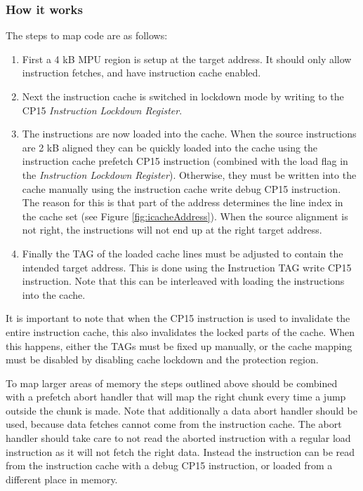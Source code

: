 \documentclass[a4paper,10pt]{report}
\begin{document}
	\subsubsection{How it works}
	The steps to map code are as follows:
	\begin{enumerate}
		\item First a 4 kB MPU region is setup at the target address. It should only allow instruction fetches, and have instruction cache enabled.
		
		\item Next the instruction cache is switched in lockdown mode by writing to the CP15 \textit{Instruction Lockdown Register}.
		
		\item The instructions are now loaded into the cache. When the source instructions are 2 kB aligned they can be quickly loaded into the cache using the instruction cache prefetch CP15 instruction (combined with the load flag in the \textit{Instruction Lockdown Register}). Otherwise, they must be written into the cache manually using the instruction cache write debug CP15 instruction. The reason for this is that part of the address determines the line index in the cache set (see Figure \ref{fig:icacheAddress}). When the source alignment is not right, the instructions will not end up at the right target address.
		
		\item Finally the TAG of the loaded cache lines must be adjusted to contain the intended target address. This is done using the Instruction TAG write CP15 instruction. Note that this can be interleaved with loading the instructions into the cache.
	\end{enumerate}
	It is important to note that when the CP15 instruction is used to invalidate the entire instruction cache, this also invalidates the locked parts of the cache. When this happens, either the TAGs must be fixed up manually, or the cache mapping must be disabled by disabling cache lockdown and the protection region.
	
	To map larger areas of memory the steps outlined above should be combined with a prefetch abort handler that will map the right chunk every time a jump outside the chunk is made. Note that additionally a data abort handler should be used, because data fetches cannot come from the instruction cache. The abort handler should take care to not read the aborted instruction with a regular load instruction as it will not fetch the right data. Instead the instruction can be read from the instruction cache with a debug CP15 instruction, or loaded from a different place in memory.
	
\end{document}
